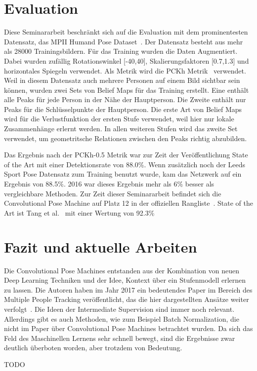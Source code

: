 \documentclass[journal, a4paper]{IEEEtran}
\begin{document}
\section{Evaluation}

        Diese Seminararbeit beschränkt sich auf die Evaluation mit dem prominentesten Datensatz, das MPII Humand Pose Dataset~\cite{Mpii_dataset}. Der Datensatz besteht aus mehr als 28000 Trainingsbildern. Für das Training wurden die Daten Augmentiert. Dabei wurden zufällig Rotationswinkel [-40\degree,40\degree], Skalierungsfaktoren [0.7,1.3] und horizontales Spiegeln verwendet. Als Metrik wird die PCKh Metrik~\cite{PCKh} verwendet. %
        Weil in diesem Datensatz auch mehrere Personen auf einem Bild sichtbar sein können, wurden zwei Sets von Belief Maps für das Training erstellt. Eine enthält alle Peaks für jede Person in der Nähe der Hauptperson. Die Zweite enthält nur Peaks für die Schlüsselpunkte der Hauptperson.
        Die erste Art von Belief Maps wird für die Verlustfunktion der ersten Stufe verwendet, weil hier nur lokale Zusammenhänge erlernt werden. In allen weiteren Stufen wird das zweite Set verwendet, um geometritsche Relationen zwischen den Peaks richtig abzubilden.

        Das Ergebnis nach der PCKh-0.5 Metrik war zur Zeit der Veröffentlichung State of the Art mit einer Detektionsrate von 88.0\%. Wenn zusätzlich noch der Leeds Sport Pose Datensatz zum Training benutzt wurde, kam das Netzwerk auf ein Ergebnis von 88.5\%. 2016 war dieses Ergebnis mehr als 6\% besser als vergleichbare Methoden. Zur Zeit dieser Seminararbeit befindet sich die Convolutional Pose Machine auf Platz 12 in der offiziellen Rangliste~\cite{Mpii_dataset}. State of the Art ist Tang et al.~\cite{Deeply Learned Compositional Models for Human Pose Estimation} mit einer Wertung von 92.3\%
        
\section{Fazit und aktuelle Arbeiten}
        Die Convolutional Pose Machines entstanden aus der Kombination von neuen Deep Learning Techniken und der Idee, Kontext über ein Stufenmodell erlernen zu lassen. Die Autoren haben im Jahr 2017 ein bedeutendes Paper im Bereich des Multiple People Tracking veröffentlicht, das die hier dargestellten Ansätze weiter verfolgt~\cite{cao2017realtime,wei2016cpm}. Die Ideen der Intermediate Supervision sind immer noch relevant. Allerdings gibt es auch Methoden, wie zum Beispiel Batch Normalization, die nicht im Paper über Convolutional Pose Machines betrachtet wurden. Da sich das Feld des Maschinellen Lernens sehr schnell bewegt, sind die Ergebnisse zwar deutlich überboten worden, aber trotzdem von Bedeutung.


\begin{thebibliography}{5}
	TODO
\end{thebibliography}
\end{document}
